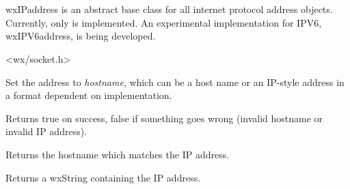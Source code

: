 \section{}\label{wxipaddress}

wxIPaddress is an abstract base class for all internet protocol address 
objects. Currently, only  
is implemented. An experimental implementation for IPV6, wxIPV6address,
is being developed.




<wx/socket.h>


%
%

\label{wxipaddresshostname}


Set the address to {\it hostname}, which can be a host name
or an IP-style address in a format dependent on implementation.


Returns true on success, false if something goes wrong
(invalid hostname or invalid IP address).


Returns the hostname which matches the IP address.

%
%

\label{wxipaddressipaddress}


Returns a wxString containing the IP address.

%
%

\label{wxipaddressservice}


